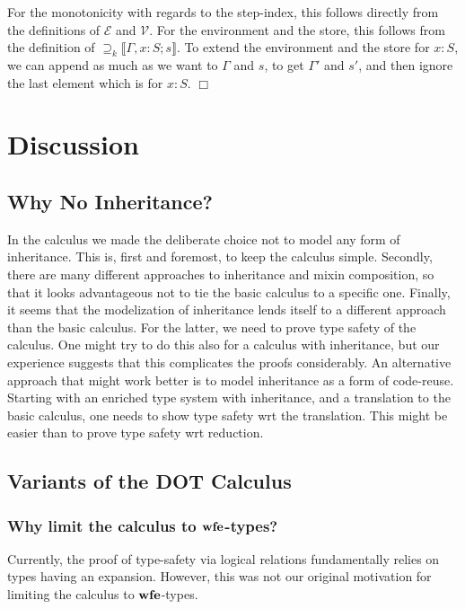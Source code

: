 \documentclass[9pt]{sigplanconf}
\newenvironment{proofsketch}{{\em Proof Sketch:}}{$\Box$}
\newcommand{\nswfe}{\mbox{\textbf{wfe}}}
\newcommand{\envplus}[1]{, #1}
\newcommand{\rels}[3]{\mathcal{\supseteq}_{#1}\llbracket#2;#3\rrbracket}
\begin{document}
\begin{proofsketch}
For the monotonicity with regards to the step-index, this follows
directly from the definitions of $\mathcal{E}$ and $\mathcal{V}$. For the
environment and the store, this follows from the definition of $\rels
k {\Gamma \envplus{x : S}} s$. To extend the environment and the store
for $x : S$, we can append as much as we want to $\Gamma$ and $s$, to
get $\Gamma'$ and $s'$, and then ignore the last element which is for
$x : S$.
\end{proofsketch}

\section{Discussion}\label{discussion}

\subsection{Why No Inheritance?}\label{why-no-inheritance}

In the calculus we made the deliberate choice not to model any form of
inheritance. This is, first and foremost, to keep the calculus simple.
Secondly, there are many different approaches to inheritance and
mixin composition, so that it looks advantageous not to tie the basic
calculus to a specific one. Finally, it seems that the modelization of
inheritance lends itself to a different approach than the basic
calculus. For the latter, we need to prove type safety of the calculus.
One might try to do this also for a calculus with inheritance, but our
experience suggests that this complicates the proofs considerably.  An
alternative approach that might work better is to model inheritance
as a form of code-reuse. Starting with an enriched type system with
inheritance, and a translation to the basic calculus, one needs to
show type safety wrt the translation. This might be easier than
to prove type safety wrt reduction.

\subsection{Variants of the DOT Calculus}\label{dot-variants}

\subsubsection{Why limit the calculus to $\nswfe$-types?}

Currently, the proof of type-safety via logical relations
fundamentally relies on types having an expansion. However, this was
not our original motivation for limiting the calculus to $\nswfe$-types.
\end{document}
